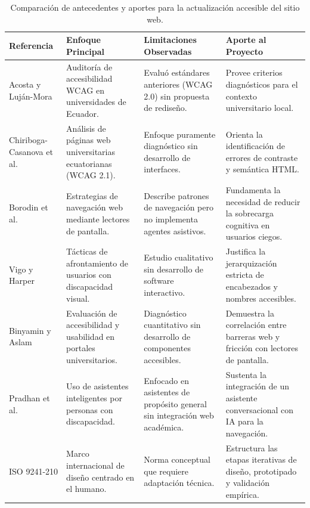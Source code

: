 \begin{table}[htbp]
  \centering
  \small
  \caption{Comparación de antecedentes y aportes para la actualización accesible del sitio web.}
  \label{tab:antecedentes}
  \setlength{\tabcolsep}{4pt}
  \renewcommand{\arraystretch}{1.25}
  \begin{tabular}{|p{}|p{}|p{}|p{}|}
    \hline
    \textbf{Referencia} & \textbf{Enfoque Principal} & \textbf{Limitaciones Observadas} & \textbf{Aporte al Proyecto} \\
    \hline
    Acosta y Luján-Mora \cite{acosta2017analisis} & Auditoría de accesibilidad WCAG en universidades de Ecuador. & Evaluó estándares anteriores (WCAG 2.0) sin propuesta de rediseño. & Provee criterios diagnósticos para el contexto universitario local. \\
    \hline
    Chiriboga-Casanova et al. \cite{chiriboga2024accessibility} & Análisis de páginas web universitarias ecuatorianas (WCAG 2.1). & Enfoque puramente diagnóstico sin desarrollo de interfaces. & Orienta la identificación de errores de contraste y semántica HTML. \\
    \hline
    Borodin et al. \cite{borodin2010more} & Estrategias de navegación web mediante lectores de pantalla. & Describe patrones de navegación pero no implementa agentes asistivos. & Fundamenta la necesidad de reducir la sobrecarga cognitiva en usuarios ciegos. \\
    \hline
    Vigo y Harper \cite{vigo2013coping} & Tácticas de afrontamiento de usuarios con discapacidad visual. & Estudio cualitativo sin desarrollo de software interactivo. & Justifica la jerarquización estricta de encabezados y nombres accesibles. \\
    \hline
    Binyamin y Aslam \cite{binyamin2024accessibility} & Evaluación de accesibilidad y usabilidad en portales universitarios. & Diagnóstico cuantitativo sin desarrollo de componentes accesibles. & Demuestra la correlación entre barreras web y fricción con lectores de pantalla. \\
    \hline
    Pradhan et al. \cite{pradhan2018accessibility} & Uso de asistentes inteligentes por personas con discapacidad. & Enfocado en asistentes de propósito general sin integración web académica. & Sustenta la integración de un asistente conversacional con IA para la navegación. \\
    \hline
    ISO 9241-210 \cite{iso9241_210_2019} & Marco internacional de diseño centrado en el humano. & Norma conceptual que requiere adaptación técnica. & Estructura las etapas iterativas de diseño, prototipado y validación empírica. \\
    \hline
  \end{tabular}
\end{table}

